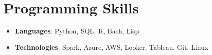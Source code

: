 \documentclass[letterpaper,11pt]{article}
\newcommand{\resumeSubHeadingListStart}{\begin{itemize}[leftmargin=*]}
\newcommand{\resumeSubHeadingListEnd}{\end{itemize}}
\begin{document}
\section{Programming Skills}
  \resumeSubHeadingListStart
    \item{
      \textbf{Languages}{: Python, SQL, R, Bash, Lisp}
    }
    \item{
      \textbf{Technologies}{: Spark, Azure, AWS, Looker, Tableau, Git, Linux}
    }
  \resumeSubHeadingListEnd


\end{document}

